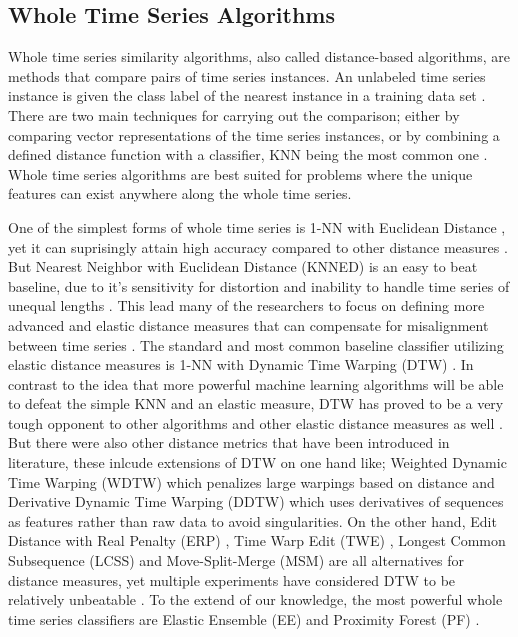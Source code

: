 \subsection{Whole Time Series Algorithms}
\label{SubsectionWhole}
Whole time series similarity algorithms, also called distance-based algorithms, are methods that compare pairs of time series instances.
An unlabeled time series instance is given the class label of the nearest instance in a training data set \cite{kate2016using}.
There are two main techniques for carrying out the comparison;
either by comparing vector representations of the time series instances,
or by combining a defined distance function with a classifier, KNN being the most common one \cite{lines2018time}.
Whole time series algorithms are best suited for problems where the unique features can exist anywhere along the whole time series\cite{bagnall2017great}.

One of the simplest forms of whole time series is 1-NN with Euclidean Distance \cite{faloutsos1994fast}, yet it can suprisingly attain high accuracy compared to other distance measures \cite{xing2010brief}.
But Nearest Neighbor with Euclidean Distance (KNNED) is an easy to beat baseline, due to it's sensitivity for distortion and inability to handle time series of unequal lengths \cite{xing2010brief,kate2016using,lines2018time}.
This lead many of the researchers to focus on defining more advanced and elastic distance measures that can compensate for misalignment between time series \cite{abanda2019review}.
The standard and most common baseline classifier utilizing elastic distance measures is 1-NN with Dynamic Time Warping (DTW) \cite{bagnall2017great}.
In contrast to the idea that more powerful machine learning algorithms will be able to defeat the simple KNN and an elastic measure,
DTW has proved to be a very tough opponent to other algorithms and other elastic distance measures as well \cite{kate2016using,lines2015time,wang2013experimental}.
But there were also other distance metrics that have been introduced in literature, these inlcude extensions of DTW on one hand like; Weighted Dynamic Time Warping (WDTW) which penalizes large warpings based on distance \cite{jeong2011weighted}
and Derivative Dynamic Time Warping (DDTW) \cite{keogh2001derivative,gorecki2013using} which uses derivatives of sequences as features rather than raw data to avoid singularities.
On the other hand, Edit Distance with Real Penalty (ERP) \cite{chen2004marriage}, Time Warp Edit (TWE) \cite{marteau2008time}, Longest Common Subsequence (LCSS) \cite{das1997finding} and Move-Split-Merge (MSM) \cite{stefan2012move}
are all alternatives for distance measures, yet multiple experiments have considered DTW to be relatively unbeatable \cite{bagnall2017great,abanda2019review,bostrom2017shapelet}.
To the extend of our knowledge, the most powerful whole time series classifiers are Elastic Ensemble (EE) \cite{lines2015time} and Proximity Forest (PF) \cite{lucas2019proximity}.

